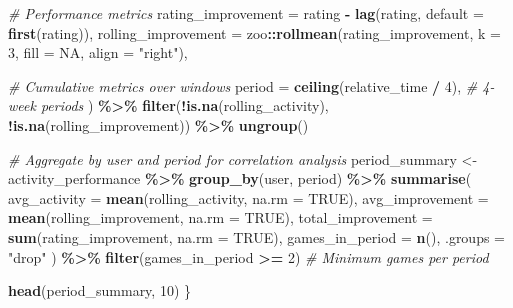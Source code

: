 \documentclass[
]{article}
\newenvironment{Shaded}{\begin{snugshade}}{\end{snugshade}}
\newcommand{\AttributeTok}[1]{\textcolor[rgb]{0.13,0.29,0.53}{#1}}
\newcommand{\CommentTok}[1]{\textcolor[rgb]{0.56,0.35,0.01}{\textit{#1}}}
\newcommand{\ConstantTok}[1]{\textcolor[rgb]{0.56,0.35,0.01}{#1}}
\newcommand{\DecValTok}[1]{\textcolor[rgb]{0.00,0.00,0.81}{#1}}
\newcommand{\FunctionTok}[1]{\textcolor[rgb]{0.13,0.29,0.53}{\textbf{#1}}}
\newcommand{\NormalTok}[1]{#1}
\newcommand{\OtherTok}[1]{\textcolor[rgb]{0.56,0.35,0.01}{#1}}
\newcommand{\SpecialCharTok}[1]{\textcolor[rgb]{0.81,0.36,0.00}{\textbf{#1}}}
\newcommand{\StringTok}[1]{\textcolor[rgb]{0.31,0.60,0.02}{#1}}
\begin{document}
\begin{Shaded}
\begin{Highlighting}[]
            \CommentTok{\# Performance metrics}
            \AttributeTok{rating\_improvement =}\NormalTok{ rating }\SpecialCharTok{{-}} \FunctionTok{lag}\NormalTok{(rating, }\AttributeTok{default =} \FunctionTok{first}\NormalTok{(rating)),}
            \AttributeTok{rolling\_improvement =}\NormalTok{ zoo}\SpecialCharTok{::}\FunctionTok{rollmean}\NormalTok{(rating\_improvement, }\AttributeTok{k =} \DecValTok{3}\NormalTok{, }\AttributeTok{fill =} \ConstantTok{NA}\NormalTok{, }\AttributeTok{align =} \StringTok{"right"}\NormalTok{),}

            \CommentTok{\# Cumulative metrics over windows}
            \AttributeTok{period =} \FunctionTok{ceiling}\NormalTok{(relative\_time }\SpecialCharTok{/} \DecValTok{4}\NormalTok{), }\CommentTok{\# 4{-}week periods}
\NormalTok{        ) }\SpecialCharTok{\%\textgreater{}\%}
        \FunctionTok{filter}\NormalTok{(}\SpecialCharTok{!}\FunctionTok{is.na}\NormalTok{(rolling\_activity), }\SpecialCharTok{!}\FunctionTok{is.na}\NormalTok{(rolling\_improvement)) }\SpecialCharTok{\%\textgreater{}\%}
        \FunctionTok{ungroup}\NormalTok{()}

    \CommentTok{\# Aggregate by user and period for correlation analysis}
\NormalTok{    period\_summary }\OtherTok{\textless{}{-}}\NormalTok{ activity\_performance }\SpecialCharTok{\%\textgreater{}\%}
        \FunctionTok{group\_by}\NormalTok{(user, period) }\SpecialCharTok{\%\textgreater{}\%}
        \FunctionTok{summarise}\NormalTok{(}
            \AttributeTok{avg\_activity =} \FunctionTok{mean}\NormalTok{(rolling\_activity, }\AttributeTok{na.rm =} \ConstantTok{TRUE}\NormalTok{),}
            \AttributeTok{avg\_improvement =} \FunctionTok{mean}\NormalTok{(rolling\_improvement, }\AttributeTok{na.rm =} \ConstantTok{TRUE}\NormalTok{),}
            \AttributeTok{total\_improvement =} \FunctionTok{sum}\NormalTok{(rating\_improvement, }\AttributeTok{na.rm =} \ConstantTok{TRUE}\NormalTok{),}
            \AttributeTok{games\_in\_period =} \FunctionTok{n}\NormalTok{(),}
            \AttributeTok{.groups =} \StringTok{"drop"}
\NormalTok{        ) }\SpecialCharTok{\%\textgreater{}\%}
        \FunctionTok{filter}\NormalTok{(games\_in\_period }\SpecialCharTok{\textgreater{}=} \DecValTok{2}\NormalTok{) }\CommentTok{\# Minimum games per period}

    \FunctionTok{head}\NormalTok{(period\_summary, }\DecValTok{10}\NormalTok{)}
\NormalTok{\}}
\end{Highlighting}
\end{Shaded}
\end{document}
